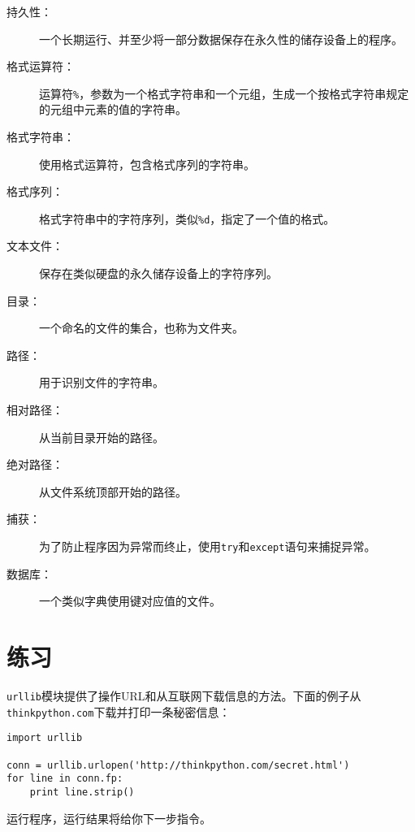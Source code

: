 \begin{description}

\item[持久性：] 一个长期运行、并至少将一部分数据保存在永久性的储存设备上的程序。

\item[格式运算符：] 运算符{\tt \%}，参数为一个格式字符串和一个元组，生成一个按格式字符串规定的元组中元素的值的字符串。

\item[格式字符串：] 使用格式运算符，包含格式序列的字符串。

\item[格式序列：] 格式字符串中的字符序列，类似{\tt \%d}，指定了一个值的格式。

\item[文本文件：] 保存在类似硬盘的永久储存设备上的字符序列。

\item[目录：] 一个命名的文件的集合，也称为文件夹。

\item[路径：] 用于识别文件的字符串。

\item[相对路径：] 从当前目录开始的路径。

\item[绝对路径：] 从文件系统顶部开始的路径。

\item[捕获：] 为了防止程序因为异常而终止，使用{\tt try}和{\tt except}语句来捕捉异常。

\item[数据库：] 一个类似字典使用键对应值的文件。

\end{description}


\section{练习}

\begin{ex}
\label{urllib}


{\tt urllib}模块提供了操作URL和从互联网下载信息的方法。下面的例子从{\tt thinkpython.com}下载并打印一条秘密信息：

\beforeverb
\begin{verbatim}
import urllib

conn = urllib.urlopen('http://thinkpython.com/secret.html')
for line in conn.fp:
    print line.strip()
\end{verbatim}
\afterverb

运行程序，运行结果将给你下一步指令。


\end{ex}

